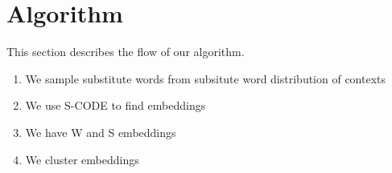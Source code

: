 \section{Algorithm}
This section describes the flow of our algorithm. 
\begin{enumerate}
  \item We sample substitute words from subsitute word distribution of contexts
  \item We use S-CODE to find embeddings 
  \item We have W and S embeddings
  \item We cluster embeddings
\end{enumerate}

